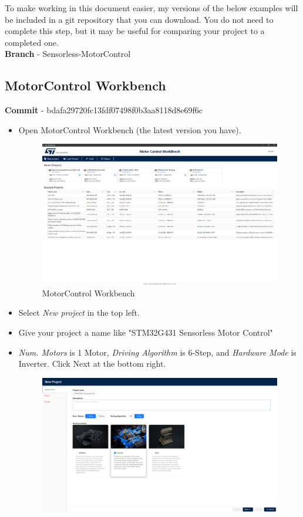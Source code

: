 \documentclass[10pt]{article}
\begin{document}
            To make working in this document easier, my versions of the below examples will be included in a git repository that you can download. You do not need to complete this step, but it may be useful for comparing your project to a completed one. \\
            \textbf{Branch} - Sensorless-MotorControl
		\FloatBarrier \subsection{MotorControl Workbench}
            \textbf{Commit} - bdafa29720fc13fdf07498f0b3aa8118d8e69f6c
            \begin{itemize}
                \item Open MotorControl Workbench (the latest version you have). 
                    \begin{figure}[H]
                        \centerline{\includegraphics[width=\textwidth]{References/MC Workbench.png}}
                        \caption{MotorControl Workbench}
                    \end{figure}
                \item Select \emph{New project} in the top left.
                \item Give your project a name like "STM32G431 Sensorless Motor Control"
                \item \emph{Num. Motors} is 1 Motor, \emph{Driving Algorithm} is 6-Step, and \emph{Hardware Mode} is Inverter. Click Next at the bottom right.
                    \begin{figure}[H]
                        \centerline{\includegraphics[width=\textwidth]{References/MCW Sensorless New Project.png}}

\end{figure}
\end{itemize}
\end{document}

